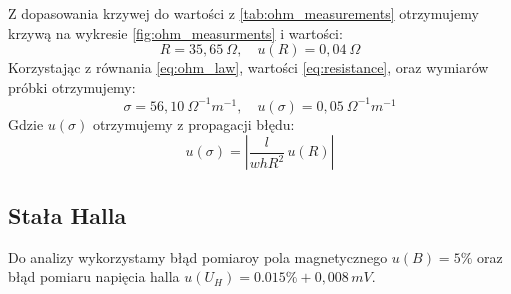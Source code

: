 \documentclass[12pt]{article}
\begin{document}
Z dopasowania krzywej do wartości z \ref{tab:ohm_measurements} otrzymujemy krzywą na wykresie \ref{fig:ohm_measurments} i wartości:
\begin{equation}
    R = 35{,}65 \ \Omega, \quad  u(R) = 0{,}04 \ \Omega
    \label{eq:resistance}
\end{equation}
Korzystając z równania \ref{eq:ohm_law}, wartości \ref{eq:resistance}, oraz wymiarów próbki otrzymujemy:
\begin{equation}
    \sigma = 56{,}10 \ \Omega^{-1}m^{-1}, \quad u(\sigma) = 0{,}05 \ \Omega^{-1}m^{-1}
    \label{eq:final_conductivity}
\end{equation}
Gdzie $u(\sigma)$ otrzymujemy z propagacji błędu:
\[
    u(\sigma) = |\frac{l}{whR^2} \, u(R)|
\]

\subsection{Stała Halla}
Do analizy wykorzystamy błąd pomiaroy pola magnetycznego\cite{magnetometer} $u(B) = 5\%$ oraz błąd pomiaru napięcia halla \cite{multimeter_big} $u(U_H) = 0.015\%+0{,}008\,mV$.
\end{document}
